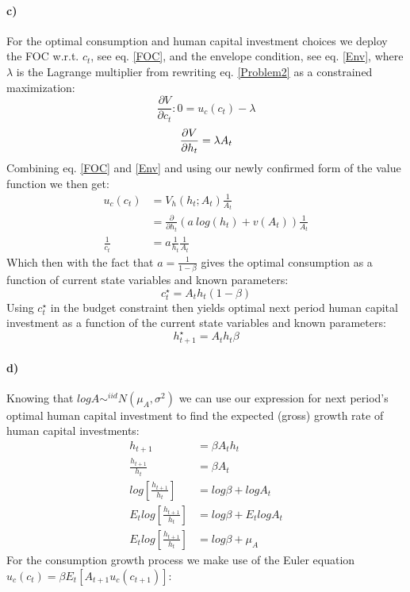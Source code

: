 \documentclass[12pt,letter]{article}
\begin{document}
\paragraph{c)}
For the optimal consumption and human capital investment choices we deploy the FOC w.r.t. $c_t$, see eq. \ref{FOC},  and the envelope condition, see eq. \ref{Env}, where $\lambda$ is the Lagrange multiplier from rewriting eq. \ref{Problem2} as a constrained maximization:
\begin{equation}\label{FOC}
\frac{\partial V}{\partial c_t}: 0 = u_c(c_t) - \lambda
\end{equation}
\begin{equation}\label{Env}
\frac{\partial V}{\partial h_t} = \lambda A_t\\
\end{equation}
Combining eq. \ref{FOC} and \ref{Env} and using our newly confirmed form of the value function we then get:
\begin{align*}
u_c(c_t)		&= V_h(h_t;A_t)\frac{1}{A_t}\\
&= \frac{\partial}{\partial h_t}(a\ log(h_t) + v(A_t))\frac{1}{A_t}\\
\frac{1}{c_t}	&= a\frac{1}{h_t}\frac{1}{A_t}
\end{align*}
Which then with the fact that $a = \frac{1}{1 - \beta}$ gives the optimal consumption as a function of current state variables and known parameters:
\begin{equation}
c_t^\star = A_t h_t (1-\beta)
\end{equation}
Using $c_t^\star$ in the budget constraint then yields optimal next period human capital investment as a function of the current state variables and known parameters:
\begin{equation}
h_{t+1}^\star = A_t h_t \beta 
\end{equation}

\paragraph{d)}
Knowing that $log A \sim^{iid} N(\mu_A,\sigma^2)$ we can use our expression for next period's optimal human capital investment to find the expected (gross) growth rate of human capital investments:
\begin{align*}
h_{t+1} 								&= \beta A_t h_t\\
\frac{h_{t+1}}{h_t} 					&= \beta A_t\\
log\left[\frac{h_{t+1}}{h_t}\right] 	&= log\beta +log A_t\\
E_t log\left[\frac{h_{t+1}}{h_t}\right] 	&= log\beta + E_t log A_t\\
E_t log\left[\frac{h_{t+1}}{h_t}\right] 	&= log\beta + \mu_A
\end{align*}
For the consumption growth process we make use of the Euler equation $u_c(c_t) = \beta E_t [A_{t+1}u_c(c_{t+1})]$:
\end{document}
